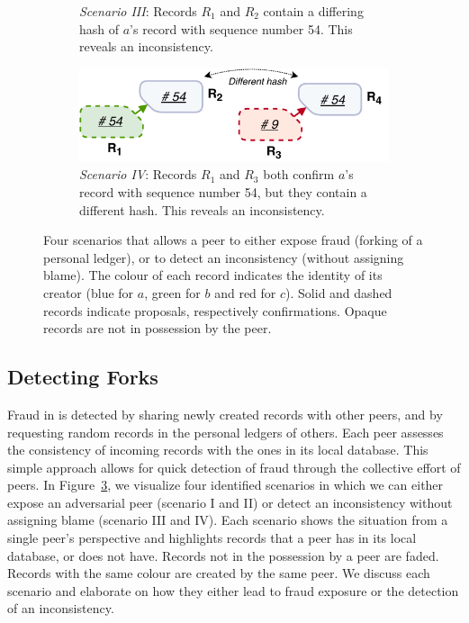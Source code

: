 \begin{figure}[t!]
\begin{subfigure}[t]{.5\textwidth}
		\caption{\emph{Scenario III}: Records $ R_1 $ and $ R_2 $ contain a differing hash of $ a $'s record with sequence number 54. This reveals an inconsistency.}
		\label{fig:fraud_scenario_3}\vspace{0.9cm}
	\end{subfigure}
	\begin{subfigure}[t]{.6\textwidth}
		\centering
		\captionsetup{width=.89\linewidth}
		\includegraphics[width=.98\linewidth]{trustchain/assets/fraud_scenario_4}
		\caption{\emph{Scenario IV}: Records $ R_1 $ and $ R_3 $ both confirm $ a $'s record with sequence number 54, but they contain a different hash. This reveals an inconsistency.}
		\label{fig:fraud_scenario_4}
	\end{subfigure}
	\caption{Four scenarios that allows a peer to either expose fraud (forking of a personal ledger), or to detect an inconsistency (without assigning blame). The colour of each record indicates the identity of its creator (blue for $ a $, green for $ b $ and red for $ c $). Solid and dashed records indicate proposals, respectively confirmations. Opaque records are not in possession by the peer.}
	\label{fig:fraud_scenarios}
\end{figure}

\subsection{Detecting Forks}
\label{sec:detecting_forks}
Fraud in \ModelName{} is detected by sharing newly created records with other peers, and by requesting random records in the personal ledgers of others.
Each peer assesses the consistency of incoming records with the ones in its local database.
This simple approach allows for quick detection of fraud through the collective effort of peers.
In Figure~\ref{fig:fraud_scenarios}, we visualize four identified scenarios in which we can either expose an adversarial peer (scenario I and II) or detect an inconsistency without assigning blame (scenario III and IV).
Each scenario shows the situation from a single peer's perspective and highlights records that a peer has in its local database, or does not have.
Records not in the possession by a peer are faded.
Records with the same colour are created by the same peer.
We discuss each scenario and elaborate on how they either lead to fraud exposure or the detection of an inconsistency.

